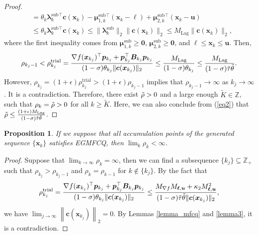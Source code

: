 \documentclass[aos]{imsart}
\numberwithin{equation}{section}
\theoremstyle{plain}
\newtheorem{proposition}{Proposition}
\begin{document}
\begin{appendix}
\begin{proof}
\begin{equation*}
\begin{split}
        & = \theta_k \bm{\lambda}_k^{\text{sub} \top} \bm{c}(\bm{x}_{k}) - \bm{\mu}_{1,k}^{\text{sub} \top}(\bm{x}_k  - \bm{\ell}) + \bm{\mu}_{2,k}^{\text{sub} \top}(\bm{x}_k  - \bm{u})\\
        & \leq \theta_k \bm{\lambda}_k^{\text{sub} \top} \bm{c}(\bm{x}_{k}) \leq \|\bm{\lambda}_k^{\text{sub}}\|_{2} \|\bm{c}(\bm{x}_{k})\|_2 \leq M_{\text{Lag}}\|\bm{c}(\bm{x}_{k})\|_2,
     \end{split}
     \end{equation*}
     where the first inequality comes from $\bm{\mu}_{1,k}^{\text{sub}} \geq \bm{0}$, $\bm{\mu}_{2,k}^{\text{sub}} \geq \bm{0}$, and $\bm{\ell} \leq \bm{x}_k \leq \bm{u}$. Then, 
     \begin{equation}
     \label{eq2}
         \rho_{k_j-1} < \rho_{k_j}^{\text{trial}} = \frac{\nabla f(\bm{x}_{k_j})^{\top} \bm{p}_{k_j} + \bm{p}_{k_j}^{\top} \bm{B}_{k_j} \bm{p}_{k_j}}{(1-\sigma)\theta_{k_j} \|\bm{c}(\bm{x}_{k_j})\|_2} \leq \frac{M_{\text{Lag}}}{(1-\sigma)\theta_{k_j}} \leq \frac{M_{\text{Lag}}}{(1-\sigma)\Tilde{\tau} \Tilde{\theta}}.
     \end{equation}
     However, $\rho_{k_j} = (1+\epsilon) \rho_{k_j}^{\text{trial}} > (1+\epsilon) \rho_{k_j-1}$ implies that $\rho_{k_j-1} \to \infty$ as $k_j \to \infty$. It is a contradiction. Therefore, there exist $\Tilde{\rho}>0$ and a large enough $\widetilde{K} \in \mathbb{Z}$, such that $\rho_k = \Tilde{\rho} > 0$ for all $k 
     \geq \widetilde{K}$. Here, we can also conclude from (\ref{eq2}) that  $\Tilde{\rho} \leq \frac{(1+\epsilon)M_{\text{Lag}}}{(1-\sigma)\Tilde{\tau} \Tilde{\theta}}$.  
 \end{proof}



\begin{proposition}
\label{prop_bound_penalty}
     If we suppose that all accumulation points of the generated sequence $\{\bm{x}_{k}\}$ satisfies EGMFCQ, then $\lim_{k} \rho_k < \infty$. 
 \end{proposition}

 \begin{proof}
     Suppose that $\lim_{k \to \infty} \rho_{k} = \infty$, then we can find a subsequence $\{k_j\} \subseteq \mathbb{Z}_{+}$ such that $\rho_{k_j} > \rho_{k_j - 1}$ and $\rho_k = \rho_{k-1}$ for $k \notin \{k_j\}$. By the fact that 
     \begin{equation*}
         \rho_{k_j}^{\text{trial}} = \frac{\nabla f(\bm{x}_{k_j})^{\top} \bm{p}_{k_j} + \bm{p}_{k_j}^{\top} \bm{B}_{k_j} \bm{p}_{k_j}}{(1-\sigma)\theta_{k_j} \|\bm{c}(\bm{x}_{k_j})\|_2} \leq \frac{M_{\nabla f} M_{\bm{\ell},\bm{u}} + \kappa_2 M_{\bm{\ell},\bm{u}}^2 }{(1-\sigma) \Tilde{\tau} \Tilde{\theta} \|\bm{c}(\bm{x}_{k_j})\|_2},
     \end{equation*}
     we have $\lim_{j \to \infty} \left\| \bm{c}(\bm{x}_{k_j}) \right\|_2 = 0$. By Lemmas \ref{lemma_mfcq} and \ref{lemma3}, it is a contradiction. 
 \end{proof}



\end{appendix}
\end{document}
